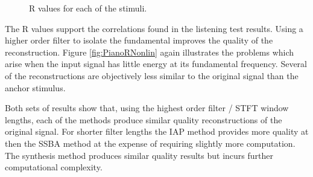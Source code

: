 \begin{figure}[h!]
		\quad
		\caption{R values for each of the stimuli.}
		\label{fig:SMCRNonlin}
	\end{figure}

	The R values support the correlations found in the listening test results. Using a higher order filter
	to isolate the fundamental improves the quality of the reconstruction. Figure \ref{fig:PianoRNonlin} again
	illustrates the problems which arise when the input signal has little energy at its fundamental frequency. Several
	of the reconstructions are objectively less similar to the original signal than the anchor stimulus.

	Both sets of results show that, using the highest order filter / STFT window lengths, each of the methods produce
	similar quality reconstructions of the original signal. For shorter filter lengths the IAP method provides more
	quality at then the SSBA method at the expense of requiring slightly more computation. The synthesis method produces
	similar quality results but incurs further computational complexity. 

